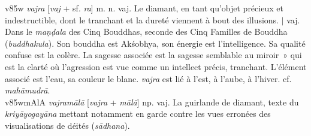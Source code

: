 \documentclass[a4paper,11pt,twocolumn]{article}
\begin{document}

{\dn v\385w} {\em vajra} [{\em vaj} + sf. {\em ra}] m. n. vaj. Le
\og diamant\fg, en tant qu'objet précieux et indestructible, dont le
tranchant et la dureté viennent à bout des illusions. $\mid$ vaj. Dans
le {\em ma\d{n}\d{d}ala} des Cinq Bouddhas, seconde des Cinq Familles
de Bouddha ({\em buddhakula}). Son bouddha est Ak\'{s}obhya, son
énergie est l'intelligence. Sa qualité confuse est la colère. La
sagesse associée est \og la sagesse semblable au miroir~» qui est la
clarté où l'agression est vue comme un intellect précis,
tranchant. L'élément associé est l'eau, sa couleur le  blanc. {\em
vajra} est lié à l'est, à l'aube, à l'hiver.  cf. {\em
mah\={a}mudr\={a}}. \\

{\dn v\385wmAlA} {\em vajram\={a}l\={a}} [{\em vajra} + {\em
m\={a}l\={a}}] np. vaj. \og La guirlande de diamant\fg, texte du {\em
kriy\={a}yogay\={a}na} mettant notamment en garde contre les vues
erronées des visualisations de déités ({\em s\={a}dhana}). \\
\end{document}
